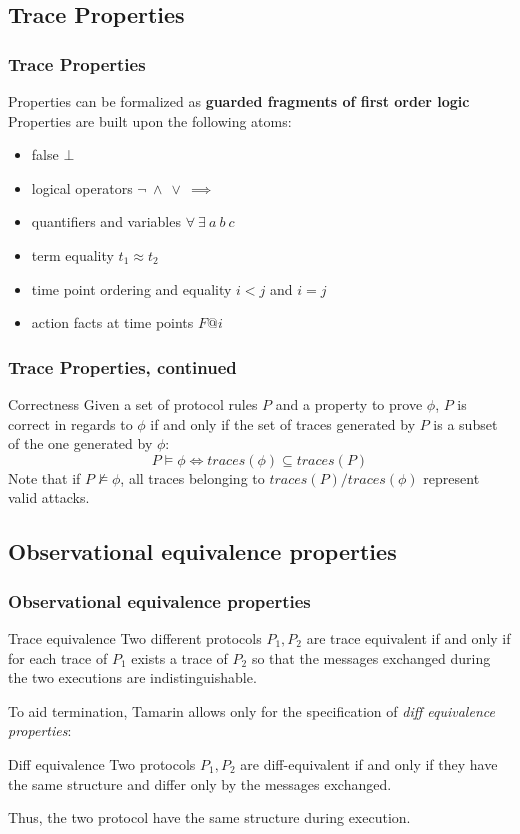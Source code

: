\documentclass[aspectratio=169,t,xcolor=table]{beamer}
\begin{document}
\subsection{Trace Properties}
\begin{frame}
    \frametitle{Trace Properties}
    Properties can be formalized as \textbf{guarded fragments of first order logic}
    Properties are built upon the following atoms:
    \begin{itemize}
        \item false $\bot$
        \item logical operators $\neg\  \wedge\  \vee\ \implies$
        \item quantifiers and variables $\forall\ \exists\ a\ b\ c$
        \item term equality $t_1 \approx t_2$
        \item time point ordering and equality $i < j$ and $i = j$
        \item action facts at time points $F @ i$
    \end{itemize}
\end{frame}

\begin{frame}
    \frametitle{Trace Properties, continued}
    \begin{block}{Correctness}
        Given a set of protocol rules $P$ and a property to prove $\phi$, $P$ is correct in regards to $\phi$ if and only if the set of traces generated by $P$ is a subset of the one generated by $\phi$:
        $$P \vDash \phi \iff traces(\phi) \subseteq traces(P)$$
        Note that if $P \nvDash \phi$, all traces belonging to $traces(P) / traces(\phi)$ represent valid attacks.
    \end{block}
\end{frame}

\subsection{Observational equivalence properties}
\begin{frame}
    \frametitle{Observational equivalence properties}
    \begin{block}{Trace equivalence}
        Two different protocols $P_1, P_2$ are trace equivalent if and only if for each trace of $P_1$ exists a trace of $P_2$ so that the messages exchanged during the two executions are indistinguishable.
    \end{block}

    To aid termination, Tamarin allows only for the specification of \textit{diff equivalence properties}:

    \begin{block}{Diff equivalence}
        Two protocols $P_1, P_2$ are diff-equivalent if and only if they have the same structure and differ only by the messages exchanged.
    
        Thus, the two protocol have the same structure during execution.
    \end{block}
\end{frame}
\end{document}
